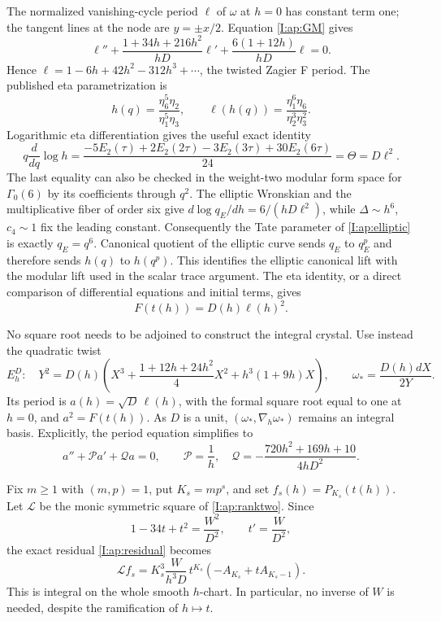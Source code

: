 \documentclass[11pt,letterpaper]{article}
\theoremstyle{definition}
\theoremstyle{remark}
\begin{document}
The normalized vanishing-cycle period $\ell$ of $\omega$ at $h=0$
has constant term one; the tangent lines at the node are $y=\pm x/2$.
Equation \eqref{I:ap:GM} gives
\[
 \ell''+\frac{1+34h+216h^2}{hD}\ell'
      +\frac{6(1+12h)}{hD}\ell=0.
\]
Hence $\ell=1-6h+42h^2-312h^3+\cdots$, the twisted Zagier F period.
The published eta parametrization is
\[
 h(q)=\frac{\eta_6^5\eta_2}{\eta_1^5\eta_3},\qquad
 \ell(h(q))=\frac{\eta_1^6\eta_6}{\eta_2^3\eta_3^2}.
\]
Logarithmic eta differentiation gives the useful exact identity
\[
 q\frac d{dq}\log h
 =\frac{-5E_2(\tau)+2E_2(2\tau)-3E_2(3\tau)+30E_2(6\tau)}{24}
 =\Theta=D\ell^2.
\]
The last equality can also be checked in the weight-two modular form
space for $\Gamma_0(6)$ by its coefficients through $q^2$. The
elliptic Wronskian and the multiplicative fiber of order six give
$d\log q_E/dh=6/(hD\ell^2)$, while $\Delta\sim h^6$, $c_4\sim1$
fix the leading constant. Consequently the Tate parameter of
\eqref{I:ap:elliptic} is exactly $q_E=q^6$. Canonical quotient of the
elliptic curve sends $q_E$ to $q_E^p$ and therefore sends $h(q)$ to
$h(q^p)$. This identifies the elliptic canonical lift with the modular
lift used in the scalar trace argument.
The eta identity, or a direct comparison of differential equations and
initial terms, gives
\begin{equation}\label{I:ap:square}
 F(t(h))=D(h)\ell(h)^2.
\end{equation}

No square root needs to be adjoined to construct the integral crystal.
Use instead the quadratic twist
\[
 E_h^D:\quad Y^2=D(h)
 \left(X^3+\frac{1+12h+24h^2}{4}X^2+h^3(1+9h)X\right),
 \qquad \omega_*=\frac{D(h)dX}{2Y}.
\]
Its period is $a(h)=\sqrt D\,\ell(h)$, with the formal square root
equal to one at $h=0$, and $a^2=F(t(h))$. As $D$ is a unit,
$(\omega_*,\nabla_h\omega_*)$ remains an integral basis. Explicitly,
the period equation simplifies to
\begin{equation}\label{I:ap:ranktwo}
 a''+\mathcal P a'+\mathcal Q a=0,\qquad
 \mathcal P=\frac1h,\quad
 \mathcal Q=-\frac{720h^2+169h+10}{4hD^2}.
\end{equation}

Fix $m\geq1$ with $(m,p)=1$, put $K_s=mp^s$, and set
$f_s(h)=P_{K_s}(t(h))$. Let $\mathcal L$ be the monic symmetric
square of \eqref{I:ap:ranktwo}. Since
\[
 1-34t+t^2=\frac{W^2}{D^2},\qquad t'=\frac W{D^2},
\]
the exact residual \eqref{I:ap:residual} becomes
\begin{equation}\label{I:ap:pullres}
 \mathcal L f_s
  =K_s^3\frac{W}{h^3D}\,t^{K_s}
               (-A_{K_s}+tA_{K_s-1}).
\end{equation}
This is integral on the whole smooth $h$-chart. In particular, no
inverse of $W$ is needed, despite the ramification of $h\mapsto t$.
\end{document}

